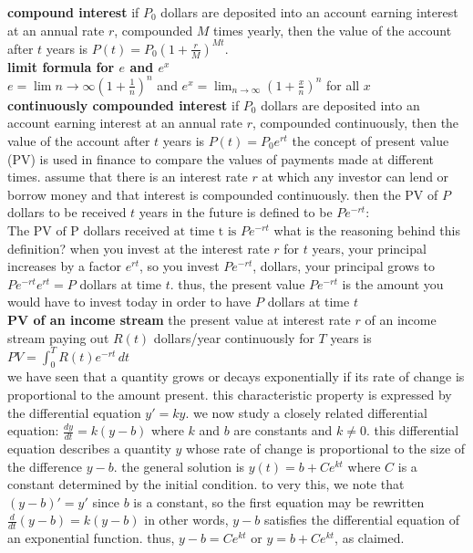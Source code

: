 \documentclass{article}
\begin{document}
\textbf{compound interest} if $P_0$ dollars are deposited into an account earning interest at an annual rate $r$, compounded $M$ times yearly, then the value of the account after $t$ years is $P(t) = P_0(1 + \frac{r}{M})^{Mt}$.\\

\textbf{limit formula for $e$ and $e^x$}\\
$e = \lim{n \to \infty}(1 + \frac{1}{n})^n$ and $e^x = \lim_{n \to \infty}(1 + \frac{x}{n})^n$ for all $x$\\

\textbf{continuously compounded interest} if $P_0$ dollars are deposited into an account earning interest at an annual rate $r$, compounded continuously, then the value of the account after $t$ years is $P(t) = P_0e^{rt}$ the concept of present value (PV) is used in finance to compare the values of payments made at different times. assume that there is an interest rate $r$ at which any investor can lend or borrow money and that interest is compounded continuously. then the PV of $P$ dollars to be received $t$ years in the future is defined to be $Pe^{-rt}$: $\text{The PV of P dollars received at time t is } Pe^{-rt}$ what is the reasoning behind this definition? when you invest at the interest rate $r$ for $t$ years, your principal increases by a factor $e^{rt}$, so you invest $Pe^{-rt}$, dollars, your principal grows to $Pe^{-rt}e^{rt} = P$ dollars at time $t$. thus, the present value $Pe^{-rt}$ is the amount you would have to invest today in order to have $P$ dollars at time $t$\\

\textbf{PV of an income stream} the present value at interest rate $r$ of an income stream paying out $R(t)$ dollars/year continuously for $T$ years is $PV = \int_{0}^{T}R(t)e^{-rt}\,dt$\\

we have seen that a quantity grows or decays exponentially if its rate of change is proportional to the amount present. this characteristic property is expressed by the differential equation $y' = ky$. we now study a closely related differential equation: $\frac{dy}{dt} = k(y - b)$ where $k$ and $b$ are constants and $k \neq 0$. this differential equation describes a quantity $y$ whose rate of change is proportional to the size of the difference $y - b$. the general solution is $y(t) = b + Ce^{kt}$ where $C$ is a constant determined by the initial condition. to very this, we note that $(y - b)' = y'$ since $b$ is a constant, so the first equation may be rewritten $\frac{d}{dt}(y - b) = k(y - b)$ in other words, $y - b$ satisfies the differential equation of an exponential function. thus, $y - b = Ce^{kt}$ or $y = b + Ce^{kt}$, as claimed.\\
\end{document}
